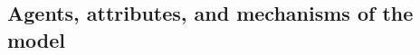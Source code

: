 \documentclass[10pt,a4paper]{article}
\theoremstyle{definition}
\theoremstyle{remark}
\begin{document}
\subsection{Agents, attributes, and mechanisms of the model}

%
%
%
%
\end{document}
